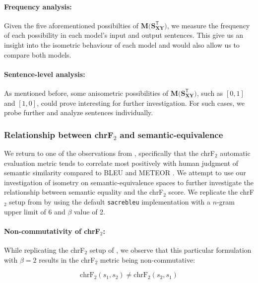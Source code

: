 \documentclass[11pt,a4paper]{article}
\begin{document}
\paragraph{Frequency analysis:} Given the five aforementioned possibilties of $\mathbf{M(S_{XY}^{\mathsf{T}}})$, we measure the frequency of each possibility in each model's input and output sentences. This give us an insight into the isometric behaviour of each model and would also allow us to compare both models.

\paragraph{Sentence-level analysis:} As mentioned before, some anisometric possibilities of $\mathbf{M(S_{XY}^{\mathsf{T}}})$, such as $[0,1]$ and $[1,0]$, could prove interesting for further investigation. For such cases, we probe further and analyze sentences individually.

\subsubsection{Relationship between chrF$_2$ and semantic-equivalence}

We return to one of the observations from \citet{michel2019evaluation}, specifically that the chrF$_2$ automatic evaluation metric \cite{popovic2015chrf} tends to correlate most positively with human judgment of semantic similarity compared to BLEU \cite{papineni2002bleu} and METEOR \cite{denkowski2014meteor}. We attempt to use our investigation of isometry on semantic-equivalence spaces to further investigate the relationship between semantic equality and the chrF$_2$ score. We replicate the chrF$_2$ setup from \citet{michel2019evaluation} by using the default \texttt{sacrebleu} implementation \cite{post-2018-call} with a $n$-gram upper limit of 6 and $\beta$ value of 2.

\paragraph{Non-commutativity of chrF$_2$:} While replicating the chrF$_2$ setup of \citet{michel2019evaluation}, we observe that this particular formulation with $\beta = 2$ results in the chrF$_2$ metric being non-commutative:

\begin{equation}
  \text{chrF}_{2}(s_1,s_2) \neq \text{chrF}_{2}(s_2,s_1)
\end{equation}
\end{document}
